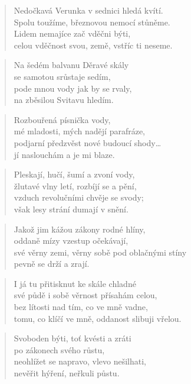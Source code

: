 \documentclass{book}
\begin{document}
\begin{verse}
Nedočkavá Verunka v sednici hledá kvítí.\\
Spolu toužíme, březnovou nemocí stůněme.\\
Lidem nemajíce zač vděčni býti,\\
celou vděčnost svou, země, vstříc ti neseme.
\end{verse}
\newpage
{}
\begin{verse}
Na šedém balvanu Děravé skály\\
se samotou srůstaje sedím,\\
pode mnou vody jak by se rvaly,\\
na zběsilou Svitavu hledím.
\end{verse}
\begin{verse}
Rozbouřená písnička vody,\\
mé mladosti, mých nadějí parafráze,\\
podjarní předzvěst nové budoucí shody\ldots\\
jí naslouchám a je mi blaze.
\end{verse}
\begin{verse}
Pleskají, hučí, šumí a zvoní vody,\\
žlutavé vlny letí, rozbíjí se a pění,\\
vzduch revolučními chvěje se svody;\\
však lesy strání dumají v snění.
\end{verse}
\begin{verse}
Jakož jim kážou zákony rodné hlíny,\\
oddaně mízy vzestup očekávají,\\
své věrny zemi, věrny sobě pod oblačnými stíny\\
pevně se drží a zrají.
\end{verse}
\begin{verse}
I já tu přitisknut ke skále chladné\\
své půdě i sobě věrnost přísahám celou,\\
bez lítosti nad tím, co ve mně vadne,\\
tomu, co klíčí ve mně, oddanost slibuji vřelou.
\end{verse}
\begin{verse}
Svoboden býti, toť kvésti a zráti\\
po zákonech svého růstu,\\
neohlížet se napravo, vlevo nešilhati,\\
nevěřit hýření, neřkuli půstu.
\end{verse}
\end{document}
